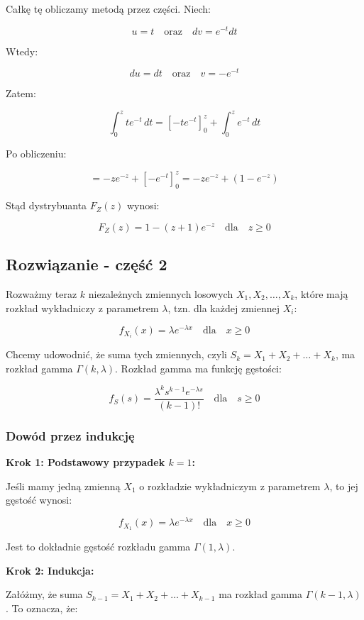 Całkę tę obliczamy metodą przez części. Niech:

\[
	u = t \quad \text{oraz} \quad dv = e^{-t} dt
\]

Wtedy:

\[
	du = dt \quad \text{oraz} \quad v = -e^{-t}
\]

Zatem:

\[
	\int_0^z t e^{-t} \, dt = \left[ -t e^{-t} \right]_0^z + \int_0^z e^{-t} \, dt
\]

Po obliczeniu:

\[
	= -z e^{-z} + \left[ -e^{-t} \right]_0^z = -z e^{-z} + (1 - e^{-z})
\]

Stąd dystrybuanta \( F_Z(z) \) wynosi:

\[
	F_Z(z) = 1 - (z + 1)e^{-z} \quad \text{dla} \quad z \geq 0
\]

\subsection*{Rozwiązanie - część 2}
Rozważmy teraz \( k \) niezależnych zmiennych losowych \( X_1, X_2, \dots, X_k \), które mają rozkład wykładniczy z parametrem \( \lambda \), tzn. dla każdej zmiennej \( X_i \):

\[
	f_{X_i}(x) = \lambda e^{-\lambda x} \quad \text{dla} \quad x \geq 0
\]

Chcemy udowodnić, że suma tych zmiennych, czyli \( S_k = X_1 + X_2 + \dots + X_k \), ma rozkład gamma \( \Gamma(k, \lambda) \). Rozkład gamma ma funkcję gęstości:

\[
	f_S(s) = \frac{\lambda^k s^{k-1} e^{-\lambda s}}{(k-1)!} \quad \text{dla} \quad s \geq 0
\]

\subsubsection*{Dowód przez indukcję}

\textbf{Krok 1: Podstawowy przypadek \( k = 1 \):}

Jeśli mamy jedną zmienną \( X_1 \) o rozkładzie wykładniczym z parametrem \( \lambda \), to jej gęstość wynosi:

\[
	f_{X_1}(x) = \lambda e^{-\lambda x} \quad \text{dla} \quad x \geq 0
\]

Jest to dokładnie gęstość rozkładu gamma \( \Gamma(1, \lambda) \).

\textbf{Krok 2: Indukcja:}

Załóżmy, że suma \( S_{k-1} = X_1 + X_2 + \dots + X_{k-1} \) ma rozkład gamma \( \Gamma(k-1, \lambda) \). To oznacza, że:

